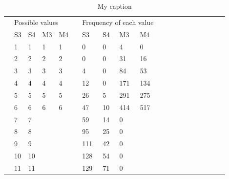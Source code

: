 \documentclass[12pt]{article}
\begin{document}
\begin{landscape}
\begin{table}[]
\centering
\caption{My caption}
\label{my-label}
\begin{tabular}{l|l|l|l|l|l|l|l|l|l|llllllllll}
\cline{2-10}
\multirow{12}{*}{} & \multicolumn{4}{l|}{Possible values} &  & \multicolumn{4}{l|}{Frequency of each value} &  &  &  &  &  &  &  &  &  &  \\ \cline{2-10}
                   & S3      & S4      & M3      & M4     &  & S3        & S4        & M3        & M4       &  &  &  &  &  &  &  &  &  &  \\ \cline{2-10}
                   & 1       & 1       & 1       & 1      &  & 0         & 0         & 4         & 0        &  &  &  &  &  &  &  &  &  &  \\ \cline{2-10}
                   & 2       & 2       & 2       & 2      &  & 0         & 0         & 31        & 16       &  &  &  &  &  &  &  &  &  &  \\ \cline{2-10}
                   & 3       & 3       & 3       & 3      &  & 4         & 0         & 84        & 53       &  &  &  &  &  &  &  &  &  &  \\ \cline{2-10}
                   & 4       & 4       & 4       & 4      &  & 12        & 0         & 171       & 134      &  &  &  &  &  &  &  &  &  &  \\ \cline{2-10}
                   & 5       & 5       & 5       & 5      &  & 26        & 5         & 291       & 275      &  &  &  &  &  &  &  &  &  &  \\ \cline{2-10}
                   & 6       & 6       & 6       & 6      &  & 47        & 10        & 414       & 517      &  &  &  &  &  &  &  &  &  &  \\ \cline{2-10}
                   & 7       & 7       &         &        &  & 59        & 14        & 0         &          &  &  &  &  &  &  &  &  &  &  \\ \cline{2-10}
                   & 8       & 8       &         &        &  & 95        & 25        & 0         &          &  &  &  &  &  &  &  &  &  &  \\ \cline{2-10}
                   & 9       & 9       &         &        &  & 111       & 42        & 0         &          &  &  &  &  &  &  &  &  &  &  \\ \cline{2-10}
                   & 10      & 10      &         &        &  & 128       & 54        & 0         &          &  &  &  &  &  &  &  &  &  &  \\ \cline{2-10}
                   & 11      & 11      &         &        &  & 129       & 71        & 0         &          &  &  &  &  &  &  &  &  &  &  \\ \cline{2-10}

\end{tabular}
\end{table}
\end{landscape}
\end{document}
